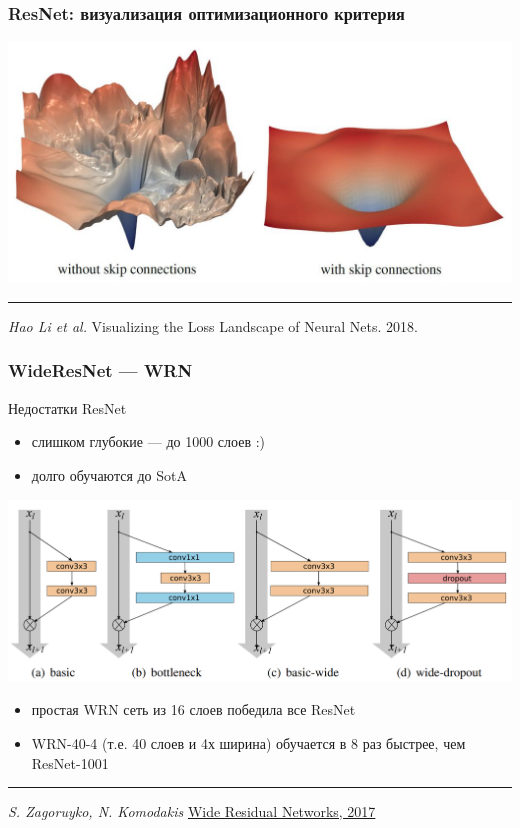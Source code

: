\documentclass[fullscreen=true, bookmarks=true, hyperref={pdfencoding=unicode}]{beamer}
\begin{document}
\begin{frame}
  \frametitle{ResNet: визуализация оптимизационного критерия}

\begin{center}
  \includegraphics[keepaspectratio,
                   width=0.7\paperwidth]{skip-connection-opt.jpg}
\end{center}

  \noindent\rule{8cm}{0.4pt}

  {\it Hao Li et al.} Visualizing the Loss Landscape of Neural Nets. 2018.
\end{frame}


\begin{frame}
  \frametitle{WideResNet — WRN}
  Недостатки ResNet
  \begin{itemize}
    \item слишком глубокие — до 1000 слоев :)
    \item долго обучаются до SotA
  \end{itemize}

  \begin{center}
    \includegraphics[keepaspectratio,
                     width=0.6\paperwidth]{wrn_blocks.png}
  \end{center}

  \begin{itemize}
    \item простая WRN сеть из 16 слоев победила все ResNet
    \item WRN-40-4 (т.е. 40 слоев и 4х ширина) обучается в 8 раз быстрее, чем ResNet-1001
  \end{itemize}

  \noindent\rule{8cm}{0.4pt}

  {\it S. Zagoruyko, N. Komodakis} \href{https://arxiv.org/pdf/1605.07146.pdf}{Wide Residual Networks, 2017}
\end{frame}
\end{document}
